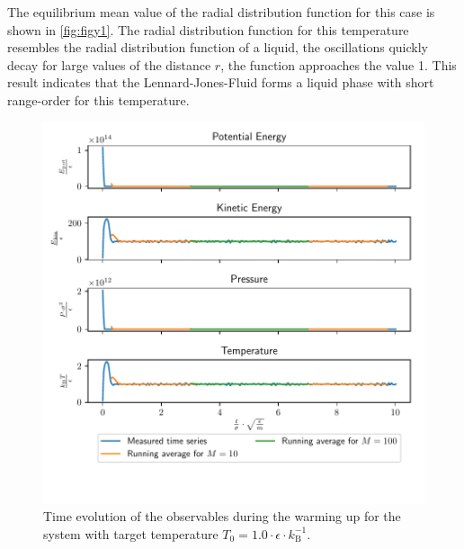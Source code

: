 \documentclass[a4paper,10pt,bibtotoc]{scrartcl}
\begin{document}
The equilibrium mean value of the radial distribution function for this case is shown in \autoref{fig:figy1}. 
The radial distribution function for this temperature resembles the radial distribution function of a liquid, the oscillations quickly decay for large values of the distance $r$, the function approaches the value 1.
This result indicates that the Lennard-Jones-Fluid forms a liquid phase with short range-order for this temperature.
\begin{figure}
        \centering
        \includegraphics[width=\linewidth]{warm1.pdf}
    \caption{Time evolution of the observables during the warming up for the system with target temperature $T_0 = 1.0\cdot \epsilon\cdot k_\mathrm{B}^{-1}$.}
    \label{fig:figy-1}
\end{figure}
\end{document}
